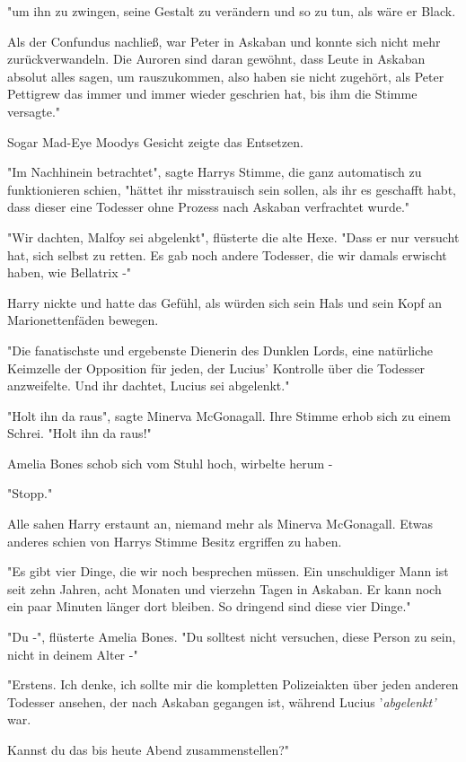 {"um ihn zu zwingen, seine Gestalt zu verändern und so zu tun, als wäre er Black.

Als der Confundus nachließ, war Peter in Askaban und konnte sich nicht mehr zurückverwandeln. Die Auroren sind daran gewöhnt, dass Leute in Askaban absolut alles sagen, um rauszukommen, also haben sie nicht zugehört, als Peter Pettigrew das immer und immer wieder geschrien hat, bis ihm die Stimme versagte."

Sogar Mad-Eye Moodys Gesicht zeigte das Entsetzen.

"Im Nachhinein betrachtet", sagte Harrys Stimme, die ganz automatisch zu funktionieren schien, "hättet ihr misstrauisch sein sollen, als ihr es geschafft habt, dass dieser eine Todesser ohne Prozess nach Askaban verfrachtet wurde."

"Wir dachten, Malfoy sei abgelenkt", flüsterte die alte Hexe. "Dass er nur versucht hat, sich selbst zu retten. Es gab noch andere Todesser, die wir damals erwischt haben, wie Bellatrix -"

Harry nickte und hatte das Gefühl, als würden sich sein Hals und sein Kopf an Marionettenfäden bewegen.

"Die fanatischste und ergebenste Dienerin des Dunklen Lords, eine natürliche Keimzelle der Opposition für jeden, der Lucius' Kontrolle über die Todesser anzweifelte. Und ihr dachtet, Lucius sei abgelenkt."

"Holt ihn da raus", sagte Minerva McGonagall. Ihre Stimme erhob sich zu einem Schrei. "Holt ihn da raus!"

Amelia Bones schob sich vom Stuhl hoch, wirbelte herum -

"Stopp."

Alle sahen Harry erstaunt an, niemand mehr als Minerva McGonagall. Etwas anderes schien von Harrys Stimme Besitz ergriffen zu haben.

"Es gibt vier Dinge, die wir noch besprechen müssen. Ein unschuldiger Mann ist seit zehn Jahren, acht Monaten und vierzehn Tagen in Askaban. Er kann noch ein paar Minuten länger dort bleiben. So dringend sind diese vier Dinge."

"Du -", flüsterte Amelia Bones. "Du solltest nicht versuchen, diese Person zu sein, nicht in deinem Alter -"

"Erstens. Ich denke, ich sollte mir die kompletten Polizeiakten über jeden anderen Todesser ansehen, der nach Askaban gegangen ist, während Lucius '\emph{abgelenkt'} war.

Kannst du das bis heute Abend zusammenstellen?"

}

